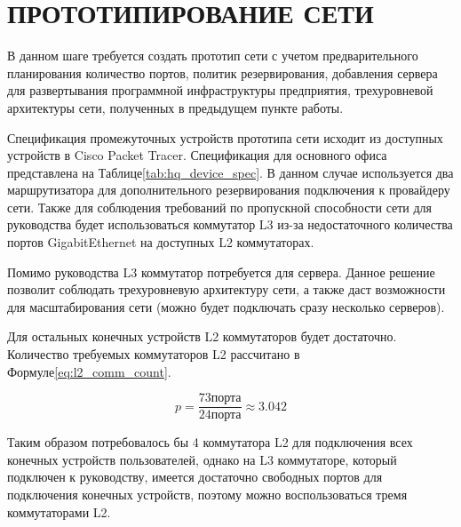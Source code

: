 \documentclass[14pt, a4paper]{extarticle}
\begin{document}
\section{ПРОТОТИПИРОВАНИЕ СЕТИ}
В данном шаге требуется создать прототип сети с учетом
предварительного планирования количество портов, политик
резервирования, добавления сервера для развертывания программной
инфраструктуры предприятия, трехуровневой архитектуры сети, полученных
в предыдущем пункте работы.

Спецификация промежуточных устройств прототипа сети исходит из
доступных устройств в Cisco Packet Tracer. Спецификация для основного
офиса представлена на Таблице\;\ref{tab:hq_device_spec}. В данном
случае используется два маршрутизатора для дополнительного
резервирования подключения к провайдеру сети. Также для соблюдения
требований по пропускной способности сети для руководства будет
использоваться коммутатор L3 из-за недостаточного количества портов
GigabitEthernet на доступных L2 коммутаторах.

Помимо руководства L3 коммутатор потребуется для сервера. Данное
решение позволит соблюдать трехуровневую архитектуру сети, а также
даст возможности для масштабирования сети (можно будет подключать
сразу несколько серверов).

Для остальных конечных устройств L2 коммутаторов будет
достаточно. Количество требуемых коммутаторов L2 рассчитано в
Формуле\;\ref{eq:l2_comm_count}.

\begin{equation}
  \label{eq:l2_comm_count}
  p = \frac{73 \text{порта}}{24 \text{порта}} \approx 3.042
\end{equation}

Таким образом потребовалось бы 4 коммутатора L2 для подключения всех
конечных устройств пользователей, однако на L3 коммутаторе, который
подключен к руководству, имеется достаточно свободных портов для
подключения конечных устройств, поэтому можно воспользоваться тремя
коммутаторами L2.
\end{document}
